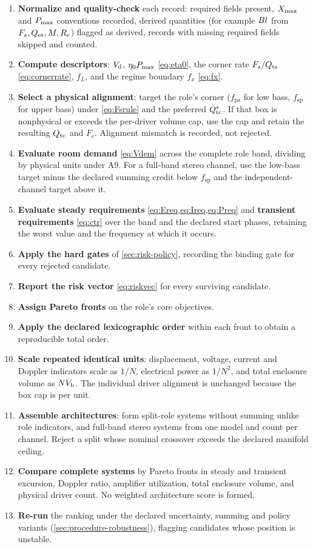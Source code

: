 \begin{enumerate}
\item \textbf{Normalize and quality-check} each record: required fields
	present, $X_{\mathrm{max}}$ and $P_{\mathrm{max}}$ conventions recorded, derived quantities
	(for example $Bl$ from $F_s,Q_{\mathrm{es}},M,R_{\mathrm{e}}$) flagged as derived, records
	with missing required fields skipped and counted.
\item \textbf{Compute descriptors}: $V_{\mathrm{d}}$, $\eta_0P_{\mathrm{max}}$ \cref{eq:eta0},
	the corner rate $F_s/Q_{\mathrm{ts}}$ \cref{eq:cornerrate}, $f_L$, and the regime
	boundary $f_x$ \cref{eq:fx}.
\item \textbf{Select a physical alignment}: target the role's corner
	($f_{\mathrm{pz}}$ for low bass, $f_{\mathrm{sp}}$ for upper bass) under
	\cref{eq:Fsrule} and the preferred $Q_{\mathrm{tc}}^\ast$. If that box is
	nonphysical or exceeds the per-driver volume cap, use the cap and retain
	the resulting $Q_{\mathrm{tc}}$ and $F_c$. Alignment mismatch is recorded, not
	rejected.
\item \textbf{Evaluate room demand} \cref{eq:Vdem} across the complete role
	band, dividing by physical units under A9. For a full-band stereo
	channel, use the low-bass target minus the declared summing credit below
	$f_{\mathrm{sp}}$ and the independent-channel target above it.
\item \textbf{Evaluate steady requirements} \cref{eq:Ereq,eq:Ireq,eq:Preq}
	and \textbf{transient requirements} \cref{eq:ctr} over the band and the
	declared start phases, retaining the worst value and the frequency at
	which it occurs.
\item \textbf{Apply the hard gates} of \cref{sec:risk-policy}, recording
	the binding gate for every rejected candidate.
\item \textbf{Report the risk vector} \cref{eq:riskvec} for every surviving
	candidate.
\item \textbf{Assign Pareto fronts} on the role's core objectives.
\item \textbf{Apply the declared lexicographic order} within each front to
	obtain a reproducible total order.
\item \textbf{Scale repeated identical units}: displacement, voltage,
	current and Doppler indicators scale as $1/N$, electrical power as
	$1/N^2$, and total enclosure volume as $NV_{\mathrm{b}}$. The individual driver
	alignment is unchanged because the box cap is per unit.
\item \textbf{Assemble architectures}: form split-role systems without
	summing unlike role indicators, and full-band stereo systems from one
	model and count per channel. Reject a split whose nominal crossover
	exceeds the declared manifold ceiling.
\item \textbf{Compare complete systems} by Pareto fronts in steady and
	transient excursion, Doppler ratio, amplifier utilization, total
	enclosure volume, and physical driver count. No weighted architecture
	score is formed.
\item \textbf{Re-run} the ranking under the declared uncertainty, summing
	and policy variants (\cref{sec:procedure-robustness}), flagging
	candidates whose position is unstable.
\end{enumerate}


